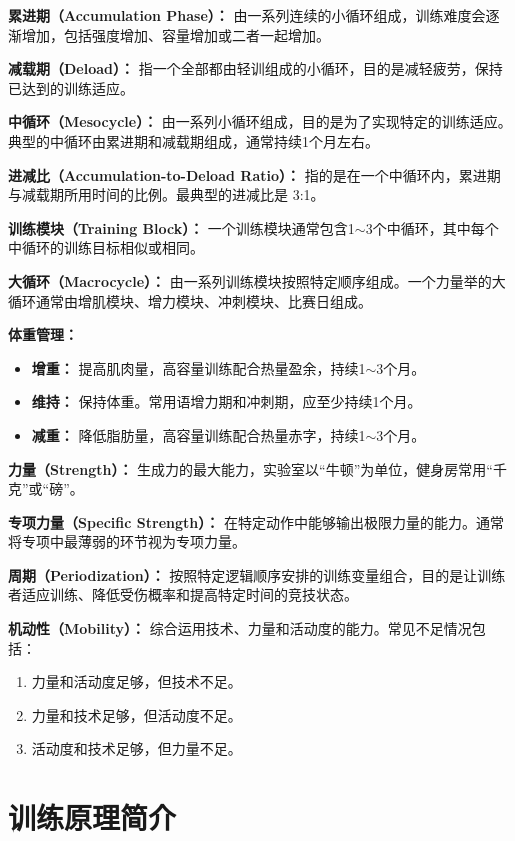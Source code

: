\documentclass[fontset=fandol, a4paper, 12pt, openright]{ctexbook}
\begin{document}
\textbf{累进期（Accumulation Phase）：} 
由一系列连续的小循环组成，训练难度会逐渐增加，包括强度增加、容量增加或二者一起增加。

\textbf{减载期（Deload）：} 
指一个全部都由轻训组成的小循环，目的是减轻疲劳，保持已达到的训练适应。

\textbf{中循环（Mesocycle）：} 
由一系列小循环组成，目的是为了实现特定的训练适应。典型的中循环由累进期和减载期组成，通常持续1个月左右。

\textbf{进减比（Accumulation-to-Deload Ratio）：} 
指的是在一个中循环内，累进期与减载期所用时间的比例。最典型的进减比是 3:1。

\textbf{训练模块（Training Block）：} 
一个训练模块通常包含1$\sim$3个中循环，其中每个中循环的训练目标相似或相同。

\textbf{大循环（Macrocycle）：} 
由一系列训练模块按照特定顺序组成。一个力量举的大循环通常由增肌模块、增力模块、冲刺模块、比赛日组成。

\textbf{体重管理：} 
\begin{itemize}
    \item \textbf{增重：} 提高肌肉量，高容量训练配合热量盈余，持续1$\sim$3个月。
    \item \textbf{维持：} 保持体重。常用语增力期和冲刺期，应至少持续1个月。
    \item \textbf{减重：} 降低脂肪量，高容量训练配合热量赤字，持续1$\sim$3个月。
\end{itemize}

\textbf{力量（Strength）：} 
生成力的最大能力，实验室以“牛顿”为单位，健身房常用“千克”或“磅”。

\textbf{专项力量（Specific Strength）：} 
在特定动作中能够输出极限力量的能力。通常将专项中最薄弱的环节视为专项力量。

\textbf{周期（Periodization）：} 
按照特定逻辑顺序安排的训练变量组合，目的是让训练者适应训练、降低受伤概率和提高特定时间的竞技状态。

\textbf{机动性（Mobility）：} 
综合运用技术、力量和活动度的能力。常见不足情况包括：
\begin{enumerate}
    \item 力量和活动度足够，但技术不足。
    \item 力量和技术足够，但活动度不足。
    \item 活动度和技术足够，但力量不足。
\end{enumerate}

\chapter{训练原理简介}
\end{document}
